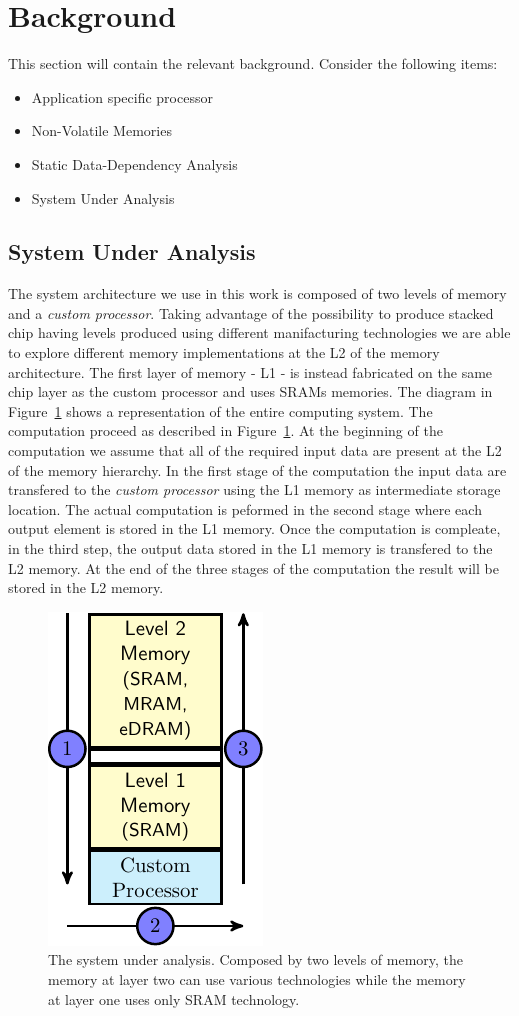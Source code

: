 \section{Background}
This section will contain the relevant background. Consider the following items:
\begin{itemize}
\item Application specific processor
\item Non-Volatile Memories
\item Static Data-Dependency Analysis
\item System Under Analysis
\end{itemize}

\subsection{System Under Analysis}
\label{ssec:system_under_analysis}
The system architecture we use in this work is composed of two levels of memory and a \textit{custom processor}. Taking advantage of the possibility to produce stacked chip having levels produced using different manifacturing technologies we are able to explore different memory implementations at the L2 of the memory architecture. The first layer of memory - L1 - is instead fabricated on the same chip layer as the custom processor and uses SRAMs memories. The diagram in Figure~\ref{fig:system} shows a representation of the entire computing system.
The computation proceed as described in Figure~\ref{fig:system}. At the beginning of the computation we assume that all of the required input data are present at the L2 of the memory hierarchy. In the first stage of the computation the input data are transfered to the \textit{custom processor} using the L1 memory as intermediate storage location. The actual computation is peformed in the second stage where each output element is stored in the L1 memory. Once the computation is compleate, in the third step, the output data stored in the L1 memory is transfered to the L2 memory. At the end of the three stages of the computation the result will be stored in the L2 memory.

\begin{figure}[tb] 
\centering
\includegraphics[width=0.25\columnwidth]{images/architecture.pdf}
\caption{\small The system under analysis. Composed by two levels of memory, the memory at layer two can use various technologies while the memory at layer one uses only SRAM technology.}
\label{fig:system}
\end{figure}

